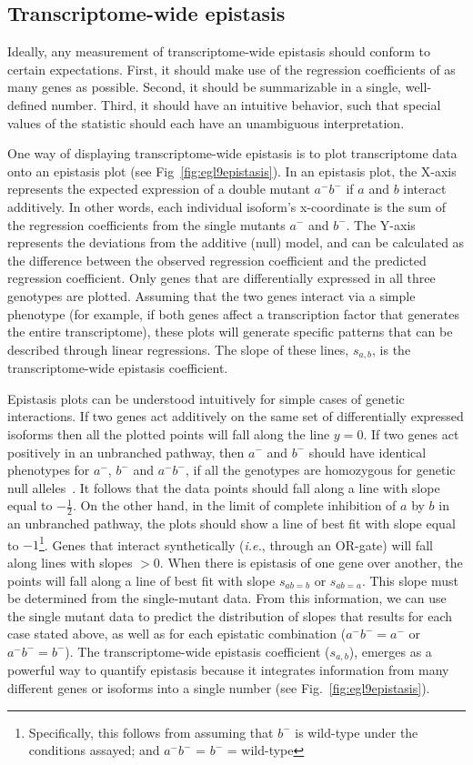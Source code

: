 \documentclass[10pt, onecolumn]{article}
\begin{document}
\subsection*{Transcriptome-wide epistasis}
Ideally, any measurement of transcriptome-wide epistasis should conform to certain
expectations. First, it should make use of the regression coefficients of as
many genes as possible. Second, it should be summarizable in a single,
well-defined number. Third, it should have an intuitive behavior, such that
special values of the statistic should each have an unambiguous interpretation.

One way of displaying transcriptome-wide epistasis is to plot transcriptome data onto
an epistasis plot (see Fig~\ref{fig:egl9epistasis}). In an epistasis plot, the
X-axis represents the expected expression of a double mutant $a^-b^-$ if $a$
and $b$ interact additively.
In other words, each individual isoform's x-coordinate is the sum of the regression
coefficients from the single mutants $a^-$ and $b^-$.
The Y-axis represents the deviations from the additive (null) model, and
can be calculated as the difference between the observed regression coefficient
and the predicted regression coefficient. Only genes that are differentially
expressed in all three genotypes are plotted. Assuming that the two genes interact
via a simple phenotype (for example, if both genes affect a transcription factor
that generates the entire transcriptome), these plots will generate specific
patterns that can be described through linear regressions. The slope of these
lines, $s_{a,b}$, is the transcriptome-wide epistasis coefficient.

Epistasis plots can be understood intuitively for simple cases of genetic
interactions. If two genes act additively on the same set of differentially expressed
isoforms then all the plotted points will fall along the line $y=0$.
If two genes act positively in an unbranched pathway, then $a^-$ and $b^-$ should
have identical phenotypes for $a^-$, $b^-$ and $a^-b^-$, if all the genotypes are
homozygous for genetic null alleles~\cite{Huang2006}. It follows that the
data points should fall along a line with slope equal to $-\frac{1}{2}$. On the
other hand, in the limit of complete inhibition of $a$ by $b$ in an unbranched
pathway, the plots should show
a line of best fit with slope equal to $-1$\footnote{Specifically, this follows
from assuming that $b^-$ is wild-type under the conditions assayed; and
$a^-b^-$ = $b^-$ = wild-type}.
Genes that interact synthetically (\emph{i.e.}, through an OR-gate) will fall
along lines with slopes $>0$. When there is epistasis of one gene over another,
the points will fall along a line of best fit with slope $s_{ab=b}$ or $s_{ab=a}$.
This slope must be determined from the single-mutant data.
From this information, we can use the single mutant data to predict the
distribution of slopes that results for each case stated above, as well as for
each epistatic combination ($a^-b^-=a^-$ or $a^-b^-=b^-$). The transcriptome-wide
epistasis coefficient ($s_{a, b}$), emerges as a powerful way to quantify epistasis
because it integrates information from many different genes or isoforms into a
single number (see Fig.~\ref{fig:egl9epistasis}).
\end{document}
